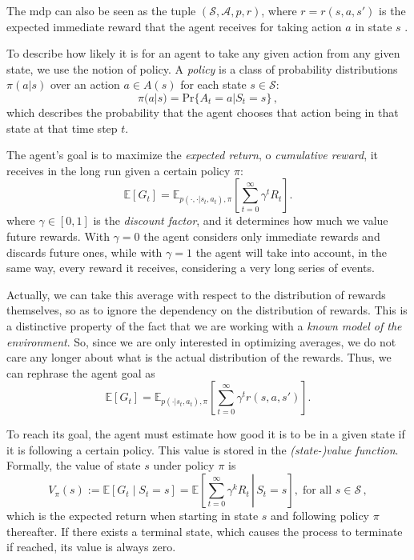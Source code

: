 The \acrshort{mdp} can also be seen as the tuple $(\mathcal S, \mathcal A, p, r)$, where $r = r(s,a,s')$ is the expected immediate reward that the agent receives for taking action $a$ in state $s$ \cite{Kaelbling1998, Uther2010}.

To describe how likely it is for an agent to take any given action from any given state, we use the notion of policy. A \emph{policy} is a class of probability distributions $\pi(a|s)$ over an action $a \in A(s)$ for each state $s \in \mathcal S$:
\begin{equation}
    \pi(a|s) = \text{Pr} \{A_t = a | S_t = s\} \, ,
    \label{eq:policy-theory}
\end{equation}
which describes the probability that the agent chooses that action being in that state at that time step $t$.

The agent's goal is to maximize the \emph{expected return}, o \emph{cumulative reward}, it receives in the long run given a certain policy $\pi$:
\begin{equation}
    \mathbb E [G_t] = \mathbb E_{p(\cdot,\cdot|s_t,a_t), \pi} \left[ \sum_{t=0}^\infty \gamma^t R_t \right].
    \label{eq:goal}
\end{equation}
where $\gamma \in [0,1]$ is the \emph{discount factor}, and it determines how much we value future rewards. With $\gamma = 0$ the agent considers only immediate rewards and discards future ones, while with $\gamma = 1$ the agent will take into account, in the same way, every reward it receives, considering a very long series of events.

Actually, we can take this average with respect to the distribution of rewards themselves, so as to ignore the dependency on the distribution of rewards. This is a distinctive property of the fact that we are working with a \textit{known model of the environment}. So, since we are only interested in optimizing averages, we do not care any longer about what is the actual distribution of the rewards. Thus, we can rephrase the agent goal as
\begin{equation}
    \mathbb E [G_t] = \mathbb E_{p(\cdot|s_t,a_t), \pi} \left[ \sum_{t=0}^\infty \gamma^t r(s, a, s') \right].
    \label{eq:goal-average}
\end{equation}

To reach its goal, the agent must estimate how good it is to be in a given state if it is following a certain policy. This value is stored in the \emph{(state-)value function}. Formally, the value of state $s$ under policy $\pi$ is
\begin{equation}
    V_\pi (s) := \mathbb E \left[ G_t \mid S_t = s \right] = \mathbb E \left[ \left. \sum_{t=0}^\infty \gamma^k R_t \, \right| \, S_t = s \right], \; \text{for all } s \in \mathcal S \, ,
\end{equation}
which is the expected return when starting in state $s$ and following policy $\pi$ thereafter. If there exists a terminal state, which causes the process to terminate if reached, its value is always zero.

